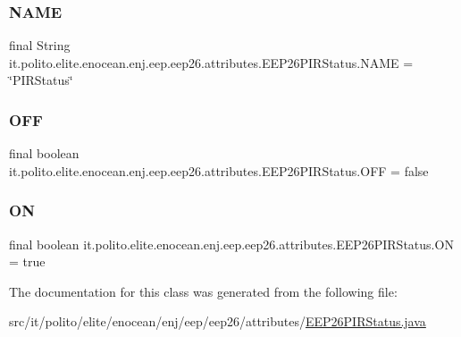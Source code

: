 \subsubsection{\texorpdfstring{N\+A\+ME}{NAME}}
{\footnotesize\ttfamily final String it.\+polito.\+elite.\+enocean.\+enj.\+eep.\+eep26.\+attributes.\+E\+E\+P26\+P\+I\+R\+Status.\+N\+A\+ME = \char`\"{}P\+I\+R\+Status\char`\"{}\hspace{0.3cm}{\ttfamily [static]}}

\hypertarget{classit_1_1polito_1_1elite_1_1enocean_1_1enj_1_1eep_1_1eep26_1_1attributes_1_1_e_e_p26_p_i_r_status_a21aa199586b981c0979a720a6d89b12c}{}\label{classit_1_1polito_1_1elite_1_1enocean_1_1enj_1_1eep_1_1eep26_1_1attributes_1_1_e_e_p26_p_i_r_status_a21aa199586b981c0979a720a6d89b12c} 
\subsubsection{\texorpdfstring{O\+FF}{OFF}}
{\footnotesize\ttfamily final boolean it.\+polito.\+elite.\+enocean.\+enj.\+eep.\+eep26.\+attributes.\+E\+E\+P26\+P\+I\+R\+Status.\+O\+FF = false\hspace{0.3cm}{\ttfamily [static]}}

\hypertarget{classit_1_1polito_1_1elite_1_1enocean_1_1enj_1_1eep_1_1eep26_1_1attributes_1_1_e_e_p26_p_i_r_status_a025527df852ed25d2908f71099646cd4}{}\label{classit_1_1polito_1_1elite_1_1enocean_1_1enj_1_1eep_1_1eep26_1_1attributes_1_1_e_e_p26_p_i_r_status_a025527df852ed25d2908f71099646cd4} 
\subsubsection{\texorpdfstring{ON}{ON}}
{\footnotesize\ttfamily final boolean it.\+polito.\+elite.\+enocean.\+enj.\+eep.\+eep26.\+attributes.\+E\+E\+P26\+P\+I\+R\+Status.\+ON = true\hspace{0.3cm}{\ttfamily [static]}}



The documentation for this class was generated from the following file\+:\begin{DoxyCompactItemize}
\item 
src/it/polito/elite/enocean/enj/eep/eep26/attributes/\hyperlink{_e_e_p26_p_i_r_status_8java}{E\+E\+P26\+P\+I\+R\+Status.\+java}\end{DoxyCompactItemize}
